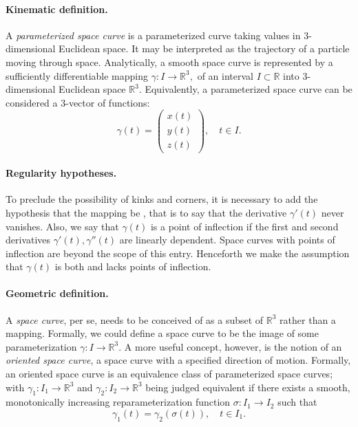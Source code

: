 \documentclass[12pt]{article}
\newcommand{\reals}{\mathbb{R}}
\begin{document}
\paragraph{Kinematic definition.}
A \emph{parameterized space curve} is a parameterized curve taking
values in 3-dimensional Euclidean space.  It may be interpreted as the
trajectory of a particle moving through space.  Analytically, a smooth
space curve is represented by a sufficiently differentiable mapping
$\gamma:I \to \reals^3, $ of an interval $I\subset \reals$ into
3-dimensional Euclidean space $\reals^3$.  Equivalently, a
parameterized space curve can be considered a 3-vector of functions:
$$\gamma(t) =
\begin{pmatrix}
  x(t)\\ y(t) \\ z(t)
\end{pmatrix},\quad t\in I.$$

\paragraph{Regularity hypotheses.}
To preclude the possibility of kinks and corners, it is
necessary to add the hypothesis that the mapping be , that is
to say that the derivative $\gamma'(t)$ never vanishes.  Also, we say
that $\gamma(t)$ is a point of inflection if the first and second
derivatives $\gamma'(t), \gamma''(t)$ are linearly dependent.  Space curves
with points of inflection are beyond the scope of this entry.
Henceforth we make the assumption that $\gamma(t)$ is both  and
lacks points of inflection.

\paragraph{Geometric definition.}
A \emph{space curve}, per se, needs to be conceived of as a subset of
$\reals^3$ rather than a mapping.  Formally, we could define a space
curve to be the image of some parameterization $\gamma:I\to\reals^3$.  A
more useful concept, however, is the notion of an \emph{oriented space
  curve}, a space curve with a specified direction of motion.
Formally, an oriented space curve is an equivalence class of
parameterized space curves; with $\gamma_1:I_1\to\reals^3$ and
$\gamma_2:I_2\to\reals^3$ being judged equivalent if there exists a
smooth, monotonically increasing reparameterization function $\sigma:
I_1\to I_2$ such that
$$\gamma_1(t) = \gamma_2(\sigma(t)),\quad t\in I_1.$$
\end{document}
